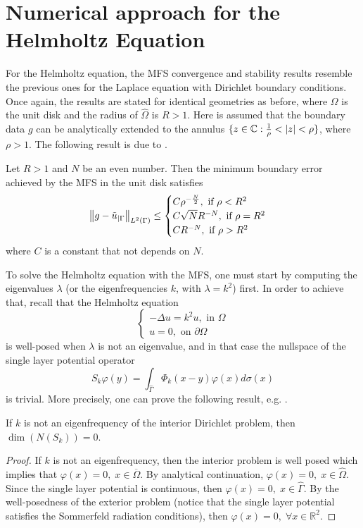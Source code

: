 \section{Numerical approach for the Helmholtz Equation}
For the Helmholtz equation, the \ac{MFS} convergence and stability results resemble the previous ones for the Laplace equation with Dirichlet boundary conditions. Once again, the results are stated for identical geometries as before, where \(\Omega\) is the unit disk and the radius of \(\hat{\Omega}\) is \(R>1\). Here is assumed that the boundary data \(g\) can be analytically extended to the annulus \(\{z \in \mathbb{C}: \frac{1}{\rho}< \abs{z} < \rho\}\), where \(\rho > 1\). The following result is due to \cite{barnett2008stability}.
\begin{theorem}
    Let \(R > 1\) and \(N\) be an even number. Then the minimum boundary error achieved by the \ac{MFS} in the unit disk satisfies
    \[
        \norm{g - \tilde{u}_{|\Gamma}}_{L^2(\Gamma)} \leq 
        \begin{cases}
            C \rho^{-\frac{N}{2}}, \text{ if } \rho < R^2\\
            C \sqrt{N} R^{-N}, \text{ if } \rho = R^2\\
            C R^{-N}, \text{ if } \rho > R^2\\
        \end{cases}
    \]
    where \(C\) is a constant that not depends on \(N\).
\end{theorem}
To solve the Helmholtz equation with the \ac{MFS}, one must start by computing the eigenvalues \(\lambda\) (or the eigenfrequencies \(k\), with \(\lambda = k^2\)) first. In order to achieve that, recall that the Helmholtz equation
\begin{equation}\label{helm_dirichlet}
    \begin{cases}
        -\Delta u = k^2 u, \text{ in } \Omega\\
        u = 0, \text{ on } \partial \Omega
    \end{cases}
\end{equation}
is well-posed when \(\lambda\) is not an eigenvalue, and in that case the nullspace of the single layer potential operator
\[
    S_k \varphi(y) = \int_{\hat{\Gamma}} \Phi_k(x-y)\varphi(x) d\sigma(x) 
\]
is trivial. More precisely, one can prove the following result, e.g. \cite{alves2005method}.
\begin{theorem}\label{MFS_helm_null_kern}
    If \(k\) is not an eigenfrequency of the interior Dirichlet problem, then \(\dim \left(N(S_k)\right)=0\).
\end{theorem}
\begin{proof}
    If \(k\) is not an eigenfrequency, then the interior problem is well posed which implies that \(\varphi(x) = 0, \; x \in \overline{\Omega}\). By analytical continuation, \(\varphi(x) = 0, \; x \in \hat{\Omega}\). Since the single layer potential is continuous, then \(\varphi(x) = 0, \; x \in \hat{\Gamma}\). By the well-posedness of the exterior problem (notice that the single layer potential satisfies the Sommerfeld radiation conditions), then \(\varphi(x) = 0, \; \forall x \in \mathbb{R}^2\).
\end{proof}


